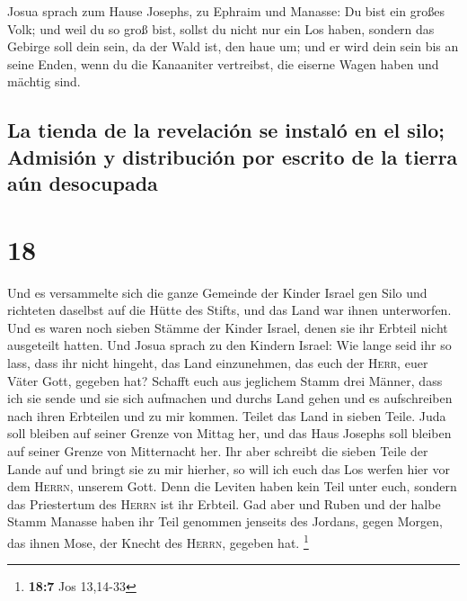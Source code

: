  Josua sprach zum Hause Josephs, zu Ephraim und Manasse:
Du bist ein großes Volk; und weil du so groß bist, sollst du nicht nur
ein Los haben,  sondern das Gebirge soll dein sein, da
der Wald ist, den haue um; und er wird dein sein bis an seine Enden,
wenn du die Kanaaniter vertreibst, die eiserne Wagen haben und mächtig
sind.

\hypertarget{la-tienda-de-la-revelaciuxf3n-se-instaluxf3-en-el-silo-admisiuxf3n-y-distribuciuxf3n-por-escrito-de-la-tierra-auxfan-desocupada}{%
\subsection{La tienda de la revelación se instaló en el silo; Admisión y
distribución por escrito de la tierra aún
desocupada}\label{la-tienda-de-la-revelaciuxf3n-se-instaluxf3-en-el-silo-admisiuxf3n-y-distribuciuxf3n-por-escrito-de-la-tierra-auxfan-desocupada}}

\hypertarget{section-17}{%
\section{18}\label{section-17}}

 Und es versammelte sich die ganze Gemeinde der Kinder
Israel gen Silo und richteten daselbst auf die Hütte des Stifts, und das
Land war ihnen unterworfen.  Und es waren noch sieben
Stämme der Kinder Israel, denen sie ihr Erbteil nicht ausgeteilt hatten.
 Und Josua sprach zu den Kindern Israel: Wie lange seid
ihr so lass, dass ihr nicht hingeht, das Land einzunehmen, das euch der
\textsc{Herr}, euer Väter Gott, gegeben hat?  Schafft euch
aus jeglichem Stamm drei Männer, dass ich sie sende und sie sich
aufmachen und durchs Land gehen und es aufschreiben nach ihren Erbteilen
und zu mir kommen.  Teilet das Land in sieben Teile. Juda
soll bleiben auf seiner Grenze von Mittag her, und das Haus Josephs soll
bleiben auf seiner Grenze von Mitternacht her.  Ihr aber
schreibt die sieben Teile der Lande auf und bringt sie zu mir hierher,
so will ich euch das Los werfen hier vor dem \textsc{Herrn}, unserem
Gott.  Denn die Leviten haben kein Teil unter euch,
sondern das Priestertum des \textsc{Herrn} ist ihr Erbteil. Gad aber und
Ruben und der halbe Stamm Manasse haben ihr Teil genommen jenseits des
Jordans, gegen Morgen, das ihnen Mose, der Knecht des \textsc{Herrn},
gegeben hat. \footnote{\textbf{18:7} Jos 13,14-33}

